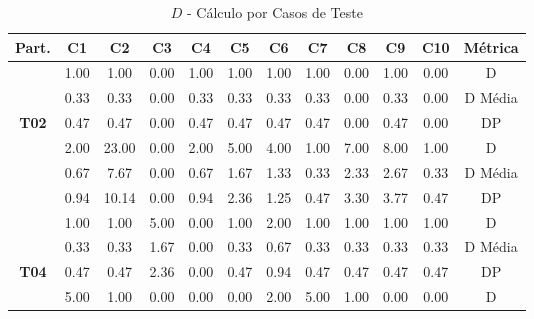 \begin{table}[htbp]
	\centering
	\caption{$D$ - Cálculo por Casos de Teste}
	\begin{tabular}{|c|c|c|c|c|c|c|c|c|c|c|c}
		\hline
		\rowcolor[HTML]{D9D9D9} 
		\cellcolor[HTML]{D0CECE}\textbf{Part.} & \textbf{C1} & \textbf{C2} & \textbf{C3} & \textbf{C4} & \textbf{C5} & \textbf{C6} & \textbf{C7} & \textbf{C8} & \textbf{C9} & \textbf{C10} & \multicolumn{1}{c|}{\cellcolor[HTML]{D0CECE}\textbf{Métrica}} \\ \hline
		\cellcolor[HTML]{F2F2F2} & 1.00 & 1.00 & 0.00 & 1.00 & 1.00 & 1.00 & 1.00 & 0.00 & 1.00 & 0.00 & \multicolumn{1}{c|}{D} \\ \cline{2-12} 
		\rowcolor[HTML]{D9D9D9} 
		\cellcolor[HTML]{F2F2F2} & 0.33 & 0.33 & 0.00 & 0.33 & 0.33 & 0.33 & 0.33 & 0.00 & 0.33 & 0.00 & \multicolumn{1}{c|}{\cellcolor[HTML]{D9D9D9}D Média} \\ \cline{2-12} 
		\multirow{-3}{*}{\cellcolor[HTML]{F2F2F2}\textbf{T02}} & 0.47 & 0.47 & 0.00 & 0.47 & 0.47 & 0.47 & 0.47 & 0.00 & 0.47 & 0.00 & \multicolumn{1}{c|}{DP} \\ \hline
		\rowcolor[HTML]{D9D9D9} 
		\cellcolor[HTML]{F2F2F2} & 2.00 & 23.00 & 0.00 & 2.00 & 5.00 & 4.00 & 1.00 & 7.00 & 8.00 & 1.00 & \multicolumn{1}{c|}{\cellcolor[HTML]{D9D9D9}D} \\ \cline{2-12} 
		\cellcolor[HTML]{F2F2F2} & 0.67 & 7.67 & 0.00 & 0.67 & 1.67 & 1.33 & 0.33 & 2.33 & 2.67 & 0.33 & \multicolumn{1}{c|}{D Média} \\ \cline{2-12} 
		\rowcolor[HTML]{D9D9D9} 
		\multirow{-3}{*}{\cellcolor[HTML]{F2F2F2}\textbf{T03}} & 0.94 & 10.14 & 0.00 & 0.94 & 2.36 & 1.25 & 0.47 & 3.30 & 3.77 & 0.47 & \multicolumn{1}{c|}{\cellcolor[HTML]{D9D9D9}DP} \\ \hline
		\cellcolor[HTML]{F2F2F2} & 1.00 & 1.00 & 5.00 & 0.00 & 1.00 & 2.00 & 1.00 & 1.00 & 1.00 & 1.00 & \multicolumn{1}{c|}{D} \\ \cline{2-12} 
		\rowcolor[HTML]{D9D9D9} 
		\cellcolor[HTML]{F2F2F2} & 0.33 & 0.33 & 1.67 & 0.00 & 0.33 & 0.67 & 0.33 & 0.33 & 0.33 & 0.33 & \multicolumn{1}{c|}{\cellcolor[HTML]{D9D9D9}D Média} \\ \cline{2-12} 
		\multirow{-3}{*}{\cellcolor[HTML]{F2F2F2}\textbf{T04}} & 0.47 & 0.47 & 2.36 & 0.00 & 0.47 & 0.94 & 0.47 & 0.47 & 0.47 & 0.47 & \multicolumn{1}{c|}{DP} \\ \hline
		\rowcolor[HTML]{D9D9D9} 
		\cellcolor[HTML]{F2F2F2} & 5.00 & 1.00 & 0.00 & 0.00 & 0.00 & 2.00 & 5.00 & 1.00 & 0.00 & 0.00 & \multicolumn{1}{c|}{\cellcolor[HTML]{D9D9D9}D} \\ \cline{2-12} 

\end{tabular}
\end{table}
